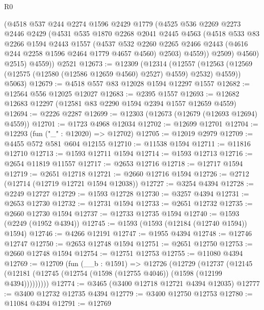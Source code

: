 \begin{lexlean}{R0}
\begin{coremodule}
          (@4518
            @537
            @244
            @2274
            @1596
            @2429
            @1779
            (@4525
              @536
              @2269
              @2273
              @2446
              @2429
              (@4531
                @535
                @1870
                @2268
                @2041
                @2445
                @4563
                (@4518
                  @533
                  @83
                  @2266
                  @1594
                  @2443
                  @1557
                  (@4537
                    @532
                    @2260
                    @2265
                    @2466
                    @2443
                    (@4616 @244 @2258 @1596 @2464 @1779 @4657 @4560)
                    @2503)
                  @4559))
              @2509)
            @4560)
          @2515)
        @4559))
    @2521
@12673 := @12309
    (@12314
      (@12557 (@12563 (@12569 (@12575 (@12580 (@12586 @12659 @4560) @2527) @4559) @2532) @4559))
      @5063)
@12679 := @4518 @557 @83 @12028 @1594 @12297 @1557
@12682 := @12564 @556 @12025 @12027
@12683 := @2395 @1557
@12693 := @12682 @12683 @12297 (@12581 @83 @2290 @1594 @2394 @1557 @12659 @4559)
@12694 := @2226 @2287
@12699 := @12303 (@12673 (@12679 (@12693 @12694) @4559))
@12701 := @1723 @4968 @12034
@12702 := @12699 @12701
@12704 := @12293 (fun ("_" : @12020) => @12702)
@12705 := @12019 @2979
@12709 := @4455 @572 @581 @604 @12155
@12710 := @11538 @1594
@12711 := @11816 @12710
@12713 := @1593 @12711 @1594
@12714 := @1593 @12713
@12716 := @2654 @11819 @11557
@12717 := @2653 @12716
@12718 := @12717 @1594
@12719 := @2651 @12718
@12721 := @2660 @12716 @1594
@12726 := @2712 (@12714 (@12719 @12721 @1594 @12038))
@12727 := @3254 @4394
@12728 := @2249 @12727
@12729 := @1593 @12728
@12730 := @3257 @4394
@12731 := @2653 @12730
@12732 := @12731 @1594
@12733 := @2651 @12732
@12735 := @2660 @12730 @1594
@12737 := @12733 @12735 @1594
@12740 := @1593 (@2249 (@1952 @4394))
@12745 := @1593 (@1593 (@12184 (@12740 @1594)) @1594)
@12746 := @4266 @12191
@12747 := @1955 @4394
@12748 := @12746 @12747
@12750 := @2653 @12748 @1594
@12751 := @2651 @12750
@12753 := @2660 @12748 @1594
@12754 := @12751 @12753
@12755 := @11080 @4394
@12769 := @12709
    (fun (__b : @1591) =>
    @12726
      (@12729
        (@12737 (@12145 (@12181 (@12745 (@12754 (@1598 (@12755 @4046)) (@1598 (@12199 @4394)))))))))
@12774 := @3465 (@3400 @12718 @12721 @4394 @12035)
@12777 := @3400 @12732 @12735 @4394
@12779 := @3400 @12750 @12753
@12780 := @11084 @4394
@12791 := @12769

\end{coremodule}
\end{lexlean}
